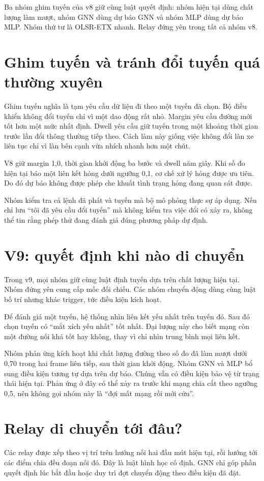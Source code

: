 Ba nhóm ghim tuyến của v8 giữ cùng luật quyết định: nhóm hiện tại dùng chất lượng làm mượt, nhóm GNN dùng dự báo GNN và nhóm MLP dùng dự báo MLP. Nhóm thứ tư là OLSR-ETX nhanh. Relay đứng yên trong tất cả nhóm v8.

\section{Ghim tuyến và tránh đổi tuyến quá thường xuyên}
Ghim tuyến nghĩa là tạm yêu cầu dữ liệu đi theo một tuyến đã chọn. Bộ điều khiển không đổi tuyến chỉ vì một dao động rất nhỏ. Margin yêu cầu đường mới tốt hơn một mức nhất định. Dwell yêu cầu giữ tuyến trong một khoảng thời gian trước lần đổi thông thường tiếp theo. Cách làm này giống việc không đổi làn xe liên tục chỉ vì làn bên cạnh vừa nhích nhanh hơn một chút.

V8 giữ margin 1,0, thời gian khởi động ba bước và dwell năm giây. Khi số đo hiện tại báo một liên kết hỏng dưới ngưỡng 0,1, cơ chế xử lý hỏng được ưu tiên. Do đó dự báo không được phép che khuất tình trạng hỏng đang quan sát được.

Nhóm kiểm tra cả lệnh đã phát và tuyến mà bộ mô phỏng thực sự áp dụng. Nếu chỉ lưu ``tôi đã yêu cầu đổi tuyến'' mà không kiểm tra việc đổi có xảy ra, không thể tin rằng phép thử đang đánh giá đúng phương pháp dự định.

\section{V9: quyết định khi nào di chuyển}
Trong v9, mọi nhóm giữ cùng luật định tuyến dựa trên chất lượng hiện tại. Nhóm đứng yên cung cấp mốc đối chiếu. Các nhóm chuyển động dùng cùng luật bố trí nhưng khác trigger, tức điều kiện kích hoạt.

Để đánh giá một tuyến, hệ thống nhìn liên kết yếu nhất trên tuyến đó. Sau đó chọn tuyến có ``mắt xích yếu nhất'' tốt nhất. Đại lượng này cho biết mạng còn một đường nối khá tốt hay không, thay vì chỉ nhìn trung bình mọi liên kết.

Nhóm phản ứng kích hoạt khi chất lượng đường theo số đo đã làm mượt dưới 0,70 trong hai frame liên tiếp, sau thời gian khởi động. Nhóm GNN và MLP bổ sung điều kiện tương tự dựa trên dự báo. Chúng vẫn có điều kiện bảo vệ từ trạng thái hiện tại. Phản ứng ở đây có thể xảy ra trước khi mạng chia cắt theo ngưỡng 0,5, nên không gọi nhóm này là ``đợi mất mạng rồi mới cứu''.

\section{Relay di chuyển tới đâu?}
Các relay được xếp theo vị trí trên hướng nối hai đầu mút hiện tại, rồi hướng tới các điểm chia đều đoạn nối đó. Đây là luật hình học cố định. GNN chỉ góp phần quyết định lúc bắt đầu hoặc duy trì đợt chuyển động theo điều kiện đã đặt.

